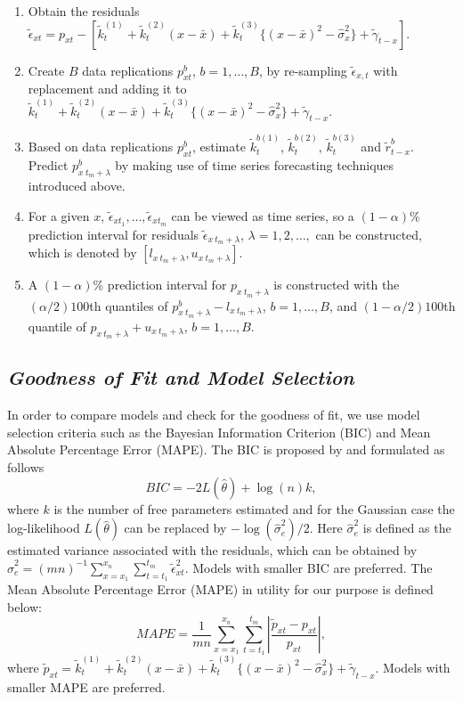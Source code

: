 \documentclass[11pt,letterpaper]{article}
\numberwithin{equation}{section}
\begin{document}
\begin{enumerate}
\item Obtain the residuals $\tilde{\epsilon}_{xt}=p_{xt}-[\tilde{k}_t^{(1)}+ \tilde{k}_t^{(2)}(x - \bar{x}) + \tilde{k}_t^{(3)}\{(x - \bar{x})^{2} - \hat \sigma_x^{2}\}+\tilde{\gamma}_{t-x}]$.

\item Create $B$ data replications $p^b_{xt}$,  $b=1,\dots,B$, by re-sampling $\tilde{\epsilon}_{x,t}$ with replacement and adding it to $\tilde{k}_t^{(1)}+ \tilde{k}_t^{(2)}(x - \bar{x}) + \tilde{k}_t^{(3)}\{(x - \bar{x})^{2} - \hat \sigma_x^{2}\}+\tilde{\gamma}_{t-x}$.

\item Based on  data replications $p^b_{xt}$, estimate $\tilde{k}_t^{b(1)}$, $\tilde{k}_t^{b(2)}$, $\tilde{k}_t^{b(3)}$ and $\tilde{r}_{t-x}^b$. Predict $p^b_{x~t_m+\lambda}$ by making use of time series forecasting techniques introduced above.

\item For a given $x$, $\tilde{\epsilon}_{xt_1},\dots,\tilde{\epsilon}_{xt_m}$ can be viewed as time series, so a $(1-\alpha)\%$ prediction interval for residuals $\tilde{\epsilon}_{x~t_m+\lambda}$, $\lambda=1,2,\dots,$ can be constructed, which is  denoted by $[l_{x~t_m+\lambda},u_{x~t_m+\lambda}]$.

\item A $(1-\alpha)\%$ prediction interval for $p_{x~t_m+\lambda}$ is constructed with  the $(\alpha/2)100$th
quantiles of $p_{x~t_m+\lambda}^b-l_{x~t_m+\lambda}$, $b=1,\dots,B$,
and $(1-\alpha/2)100$th quantile of $p_{x~t_m+\lambda}+u_{x~t_m+\lambda}$, $b=1,\dots,B$. %
\end{enumerate}



\subsection{\textit{Goodness of Fit and Model Selection}}
In order to compare models and check for the goodness of fit, we use model selection criteria such as the Bayesian Information Criterion (BIC) and Mean Absolute Percentage Error (MAPE). The
BIC  is  proposed by \cite{Schwarz:1978} and formulated as follows
$$BIC =-2 L(\hat\theta)+\log(n)k,$$
where $k$ is the number of free parameters estimated and for the Gaussian case the log-likelihood  $L(\hat\theta)$ can be replaced by $-\log(\hat\sigma_e^2 )/2$.
Here $\hat\sigma_e^2$     is defined as the estimated variance associated with the residuals, which can be obtained by
$\hat\sigma_e^2 =(mn)^{-1}\sum_{x=x_1}^{x_n}\sum_{t=t_1}^{t_m}\tilde{\epsilon}_{xt}^2 $.
Models with smaller BIC are preferred.
The Mean Absolute Percentage Error (MAPE) in utility for our purpose is defined below:
$$MAPE=\frac{1}{mn}\sum_{x=x_1}^{x_n}\sum_{t=t_1}^{t_m} \left|\frac{\tilde{p}_{xt}-p_{xt}}{p_{xt}}\right|,$$
where $\tilde{p}_{xt}=\tilde{k}_t^{(1)}+ \tilde{k}_t^{(2)}(x - \bar{x}) + \tilde{k}_t^{(3)}\{(x - \bar{x})^{2} - \hat \sigma_x^{2}\}+\tilde{\gamma}_{t-x}$.
Models with smaller MAPE are preferred.
\end{document}
